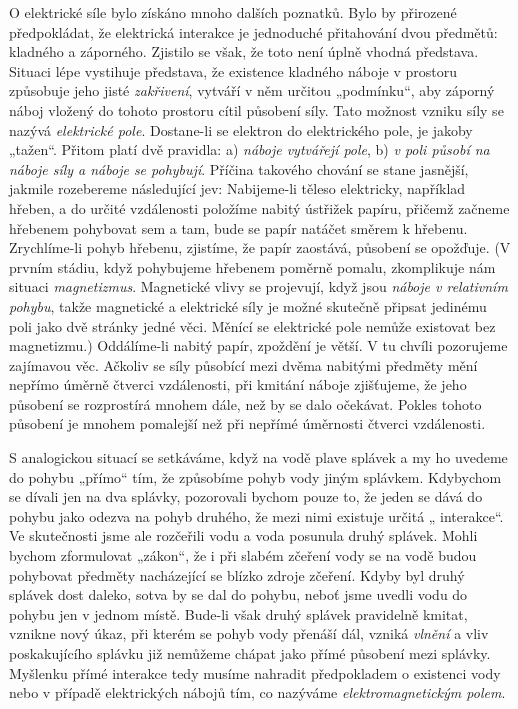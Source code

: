 {    O elektrické síle bylo získáno mnoho dalších poznatků. Bylo by přirozené předpokládat, že 
    elektrická interakce je jednoduché přitahování dvou předmětů: kladného a záporného. Zjistilo se 
    však, že toto není úplně vhodná představa. Situaci lépe vystihuje představa, že existence 
    kladného náboje v prostoru způsobuje jeho jisté \emph{zakřivení}, vytváří v něm určitou 
    „podmínku“, aby záporný náboj vložený do tohoto prostoru cítil působení síly. Tato možnost 
    vzniku síly se nazývá \emph{elektrické pole}. Dostane-li se elektron do elektrického pole, je 
    jakoby „tažen“. Přitom platí dvě pravidla: a) \emph{náboje vytvářejí pole}, b) \emph{v poli 
    působí na náboje síly a náboje se pohybují}. Příčina takového chování se stane jasnější, 
    jakmile rozebereme následující jev: Nabijeme-li těleso elektricky, například hřeben, a do 
    určité vzdálenosti položíme nabitý ústřižek papíru, přičemž začneme hřebenem pohybovat sem a 
    tam, bude se papír natáčet směrem k hřebenu. Zrychlíme-li pohyb hřebenu, zjistíme, že papír 
    zaostává, působení se opožďuje. (V prvním stádiu, když pohybujeme hřebenem poměrně 
    pomalu, zkomplikuje nám situaci \emph{magnetizmus}. Magnetické vlivy se projevují, když jsou 
    \emph{náboje v relativním pohybu}, takže magnetické a elektrické síly je možné skutečně připsat 
    jedinému poli jako dvě stránky jedné věci. Měnící se elektrické pole nemůže existovat bez 
    magnetizmu.) Oddálíme-li nabitý papír, zpoždění je větší. V tu chvíli pozorujeme zajímavou věc. 
    Ačkoliv se síly působící mezi dvěma nabitými předměty mění nepřímo úměrně čtverci vzdálenosti, 
    při kmitání náboje zjišťujeme, že jeho působení se rozprostírá mnohem dále, než by se dalo 
    očekávat. Pokles tohoto působení je mnohem pomalejší než při nepřímé úměrnosti čtverci 
    vzdálenosti.
    
    S analogickou situací se setkáváme, když na vodě plave splávek a my ho uvedeme do pohybu 
    „přímo“ tím, že způsobíme pohyb vody jiným splávkem. Kdybychom se dívali jen na dva splávky, 
    pozorovali bychom pouze to, že jeden se dává do pohybu jako odezva na pohyb druhého, že mezi 
    nimi existuje určitá „  interakce“. Ve skutečnosti jsme ale rozčeřili vodu a voda posunula 
    druhý splávek. Mohli bychom zformulovat „zákon“, že i při slabém zčeření vody se na vodě budou 
    pohybovat předměty nacházející se blízko zdroje zčeření. Kdyby byl druhý splávek dost daleko, 
    sotva by se dal do pohybu, neboť jsme uvedli vodu do pohybu jen v jednom místě. Bude-li však 
    druhý splávek pravidelně kmitat, vznikne nový úkaz, při kterém se pohyb vody přenáší dál, 
    vzniká \emph{vlnění} a vliv poskakujícího splávku již nemůžeme chápat jako přímé působení mezi 
    splávky. Myšlenku přímé interakce tedy musíme nahradit předpokladem o existenci vody nebo v 
    případě elektrických nábojů tím, co nazýváme \emph{elektromagnetickým polem}.

}
